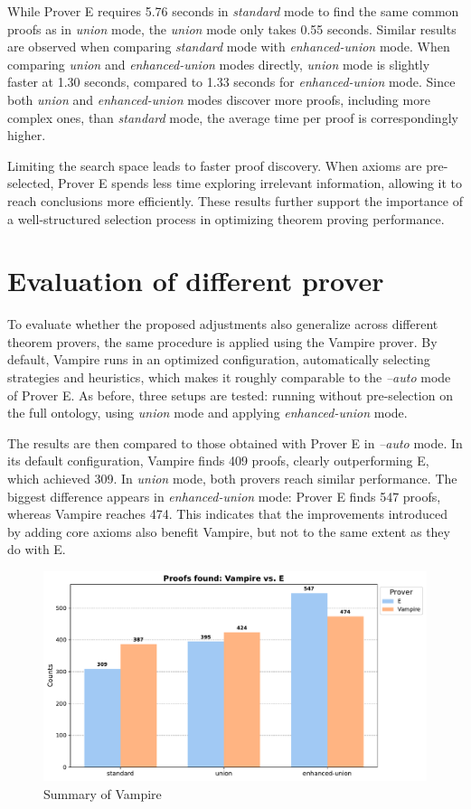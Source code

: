 \documentclass[english,version-2020-11]{uzl-thesis}
\begin{document}
While Prover E requires 5.76 seconds in \textit{standard} mode to find the same common proofs as in \textit{union} mode, the \textit{union} mode only takes 0.55 seconds. Similar results are observed when comparing \textit{standard} mode with \textit{enhanced-union} mode. When comparing \textit{union} and \textit{enhanced-union} modes directly, \textit{union} mode is slightly faster at 1.30 seconds, compared to 1.33 seconds for \textit{enhanced-union} mode. Since both \textit{union} and \textit{enhanced-union} modes discover more proofs, including more complex ones, than \textit{standard} mode, the average time per proof is correspondingly higher.


Limiting the search space leads to faster proof discovery. When axioms are pre-selected, Prover E spends less time exploring irrelevant information, allowing it to reach conclusions more efficiently. These results further support the importance of a well-structured selection process in optimizing theorem proving performance.


\section{Evaluation of different prover}
To evaluate whether the proposed adjustments also generalize across different theorem provers, the same procedure is applied using the Vampire prover. By default, Vampire runs in an optimized configuration, automatically selecting strategies and heuristics, which makes it roughly comparable to the \textit{--auto} mode of Prover E. As before, three setups are tested: running without pre-selection on the full ontology, using \textit{union} mode and applying \textit{enhanced-union} mode.

The results are then compared to those obtained with Prover E in \textit{--auto} mode. In its default configuration, Vampire finds 409 proofs, clearly outperforming E, which achieved 309. In \textit{union} mode, both provers reach similar performance. The biggest difference appears in \textit{enhanced-union} mode: Prover E finds 547 proofs, whereas Vampire reaches 474. This indicates that the improvements introduced by adding core axioms also benefit Vampire, but not to the same extent as they do with E.

\begin{figure}[h!]
    \centering
    \includegraphics[width=\textwidth]{vampire_mode_output.pdf}
    \caption{Summary of Vampire}
    \label{fig:prover_results_vampire}
\end{figure}
\FloatBarrier
\end{document}
